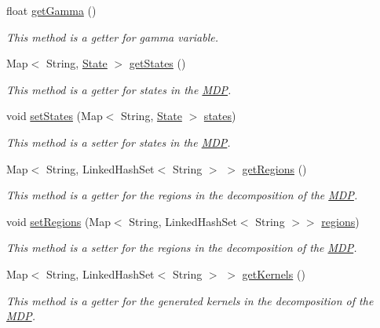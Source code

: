 \begin{DoxyCompactItemize}
float \hyperlink{classmdp_1_1core_1_1_m_d_p_af18af128ccbdc7b958e438660abe967c}{get\+Gamma} ()
\begin{DoxyCompactList}\small\item\em This method is a getter for gamma variable. \end{DoxyCompactList}\item 
Map$<$ String, \hyperlink{classmdp_1_1core_1_1_state}{State} $>$ \hyperlink{classmdp_1_1core_1_1_m_d_p_a937094aab736609618fed718de7f6b89}{get\+States} ()
\begin{DoxyCompactList}\small\item\em This method is a getter for states in the \hyperlink{classmdp_1_1core_1_1_m_d_p}{M\+D\+P}. \end{DoxyCompactList}\item 
void \hyperlink{classmdp_1_1core_1_1_m_d_p_ad6e89cf2ed34e858dcbec4324c11884e}{set\+States} (Map$<$ String, \hyperlink{classmdp_1_1core_1_1_state}{State} $>$ \hyperlink{classmdp_1_1core_1_1_m_d_p_a62bf7674d88162db7d00cfd82603b24f}{states})
\begin{DoxyCompactList}\small\item\em This method is a setter for states in the \hyperlink{classmdp_1_1core_1_1_m_d_p}{M\+D\+P}. \end{DoxyCompactList}\item 
Map$<$ String, Linked\+Hash\+Set$<$ String $>$ $>$ \hyperlink{classmdp_1_1core_1_1_m_d_p_a59a4fec8be7362cdbb9cdfaf52a4d185}{get\+Regions} ()
\begin{DoxyCompactList}\small\item\em This method is a getter for the regions in the decomposition of the \hyperlink{classmdp_1_1core_1_1_m_d_p}{M\+D\+P}. \end{DoxyCompactList}\item 
void \hyperlink{classmdp_1_1core_1_1_m_d_p_ae1e690f17a3fd4af8cbf50c8d258f8c5}{set\+Regions} (Map$<$ String, Linked\+Hash\+Set$<$ String $>$$>$ \hyperlink{classmdp_1_1core_1_1_m_d_p_a79761e7b3bb0d7a083bee7183c992893}{regions})
\begin{DoxyCompactList}\small\item\em This method is a setter for the regions in the decomposition of the \hyperlink{classmdp_1_1core_1_1_m_d_p}{M\+D\+P}. \end{DoxyCompactList}\item 
Map$<$ String, Linked\+Hash\+Set$<$ String $>$ $>$ \hyperlink{classmdp_1_1core_1_1_m_d_p_a71454b47175a82f6ebbf7f5d644bba93}{get\+Kernels} ()
\begin{DoxyCompactList}\small\item\em This method is a getter for the generated kernels in the decomposition of the \hyperlink{classmdp_1_1core_1_1_m_d_p}{M\+D\+P}. \end{DoxyCompactList}\item 
$$
\end{DoxyCompactItemize}
